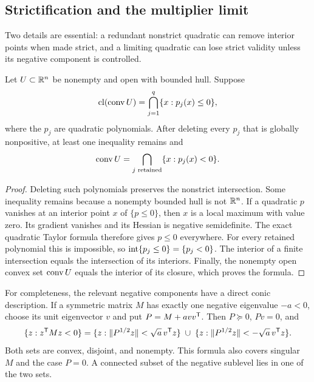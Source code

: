 \subsection{Strictification and the multiplier limit}

Two details are essential: a redundant nonstrict quadratic can remove
interior points when made strict, and a limiting quadratic can lose strict
validity unless its negative component is controlled.

\begin{lemma}[Strictification]\label{lem:strictification}
Let $U\subset\mathbb R^n$ be nonempty and open with bounded hull. Suppose
\[
 \operatorname{cl}(\operatorname{conv} U)=\bigcap_{j=1}^q\{x:p_j(x)\leq0\},
\]
where the $p_j$ are quadratic polynomials. After deleting every $p_j$
that is globally nonpositive, at least one inequality remains and
\[
 \operatorname{conv} U=\bigcap_{j\text{ retained}}\{x:p_j(x)<0\}.
\]
\end{lemma}
\begin{proof}
Deleting such polynomials preserves the nonstrict intersection. Some
inequality remains because a nonempty bounded hull is not $\mathbb R^n$.
If a quadratic $p$ vanishes at an interior point $x$ of $\{p\leq0\}$,
then $x$ is a local maximum with value zero. Its gradient vanishes and
its Hessian is negative semidefinite. The exact quadratic Taylor formula
therefore gives $p\leq0$ everywhere. For every retained polynomial this
is impossible, so $\operatorname{int}\{p_j\leq0\}=\{p_j<0\}$.
The interior of a finite intersection equals the intersection of its
interiors. Finally, the nonempty open convex set $\operatorname{conv} U$ equals the
interior of its closure, which proves the formula.
\end{proof}

For completeness, the relevant negative components have a direct conic
description. If a symmetric matrix $M$ has exactly one negative eigenvalue
$-a<0$, choose its unit eigenvector $v$ and put $P=M+avv^{\mathsf T}$.
Then $P\succeq0$, $Pv=0$, and
\begin{equation}\label{eq:negative-components}
 \{z:z^{\mathsf T} Mz<0\}
 =\{z:\|P^{1/2}z\|<\sqrt a\,v^{\mathsf T} z\}
  \;\cup\;
  \{z:\|P^{1/2}z\|<-\sqrt a\,v^{\mathsf T} z\}.
\end{equation}
Both sets are convex, disjoint, and nonempty. This formula also covers
singular $M$ and the case $P=0$. A connected subset of the negative
sublevel lies in one of the two sets.

